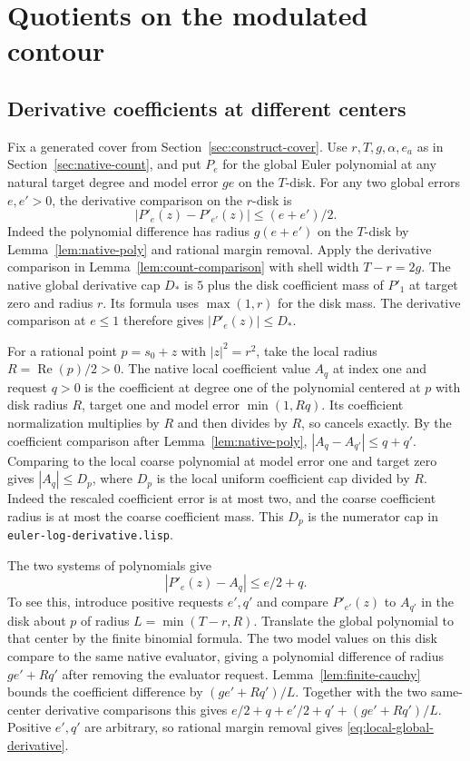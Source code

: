 \documentclass[11pt]{amsart}
\theoremstyle{definition}
\theoremstyle{remark}
\numberwithin{equation}{section}
\newcommand{\re}{\operatorname{Re}}
\newcommand{\code}[1]{\nolinkurl{#1}}
\begin{document}
\section{Quotients on the modulated contour}
\label{sec:circle-quotient}

\subsection{Derivative coefficients at different centers}

Fix a generated cover from Section~\ref{sec:construct-cover}.
Use $r,T,g,\alpha,e_a$ as in Section~\ref{sec:native-count},
and put $P_e$ for the global Euler polynomial at any
natural target degree and model error $ge$ on the $T$-disk.
For any two global errors $e,e'>0$, the derivative
comparison on the $r$-disk is
\[
          |P'_e(z)-P'_{e'}(z)|\le(e+e')/2 .
\]
Indeed the polynomial difference has radius $g(e+e')$
on the $T$-disk by Lemma~\ref{lem:native-poly} and rational
margin removal. Apply the derivative comparison in
Lemma~\ref{lem:count-comparison} with shell width $T-r=2g$.
The native global derivative cap $D_*$ is $5$ plus
the disk coefficient mass of $P'_1$ at target zero and
radius $r$. Its formula uses $\max(1,r)$ for the disk
mass. The derivative comparison at $e\le1$ therefore
gives $|P'_e(z)|\le D_*$.

For a rational point $p=s_0+z$ with $|z|^2=r^2$, take
the local radius $R=\re(p)/2>0$. The native local
coefficient value $A_q$ at index one and request $q>0$
is the coefficient at degree one of the polynomial
centered at $p$ with disk radius $R$, target one and
model error $\min(1,Rq)$. Its coefficient normalization
multiplies by $R$ and then divides by $R$, so cancels
exactly. By the coefficient comparison after
Lemma~\ref{lem:native-poly},
$|A_q-A_{q'}|\le q+q'$.
Comparing to the local coarse polynomial at model
error one and target zero gives $|A_q|\le D_p$,
where $D_p$ is the local uniform coefficient cap divided
by $R$. Indeed the rescaled coefficient error is at most
two, and the coarse coefficient radius is at most the
coarse coefficient mass. This $D_p$ is the numerator cap
in \code{euler-log-derivative.lisp}.

The two systems of polynomials give
\begin{equation}\label{eq:local-global-derivative}
                     |P'_e(z)-A_q|\le e/2+q .
\end{equation}
To see this, introduce positive requests $e',q'$ and
compare $P'_{e'}(z)$ to $A_{q'}$ in the disk about $p$
of radius $L=\min(T-r,R)$. Translate the global polynomial
to that center by the finite binomial formula.
The two model values on this disk compare to the same
native evaluator, giving a polynomial difference of
radius $ge'+Rq'$ after removing the evaluator request.
Lemma~\ref{lem:finite-cauchy} bounds the coefficient
difference by $(ge'+Rq')/L$. Together with the two
same-center derivative comparisons this gives
$e/2+q+e'/2+q'+(ge'+Rq')/L$. Positive $e',q'$
are arbitrary, so rational margin removal gives
\eqref{eq:local-global-derivative}.
\end{document}
